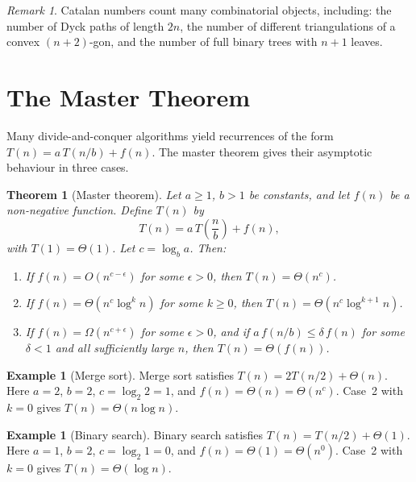 \documentclass[12pt,a4paper,openany]{book}
\theoremstyle{definition}
\newtheorem{example}[definition]{Example}
\theoremstyle{plain}
\newtheorem{theorem}[definition]{Theorem}
\theoremstyle{remark}
\newtheorem{remark}[definition]{Remark}
\begin{document}
\begin{remark}\label{rem:catalan-interpretations}
Catalan numbers count many combinatorial objects, including: the number
of Dyck paths of length $2n$, the number of different
triangulations of a convex $(n+2)$-gon, and the number of full binary
trees with $n+1$ leaves.
\end{remark}

\section{The Master Theorem}\label{sec:master}

Many divide-and-conquer algorithms yield recurrences of the form
$T(n) = a\, T(n/b) + f(n)$.  The master theorem gives their asymptotic
behaviour in three cases.

\begin{theorem}[Master theorem]\label{thm:master}
Let $a \ge 1$, $b > 1$ be constants, and let $f(n)$ be a non-negative
function.  Define $T(n)$ by
\[
   T(n) = a\, T\!\left(\frac{n}{b}\right) + f(n),
\]
with $T(1) = \Theta(1)$.  Let $c = \log_b a$.  Then:
\begin{enumerate}
\item If $f(n) = O(n^{c-\epsilon})$ for some $\epsilon > 0$, then
      $T(n) = \Theta(n^c)$.
\item If $f(n) = \Theta(n^c \log^k n)$ for some $k \ge 0$, then
      $T(n) = \Theta(n^c \log^{k+1} n)$.
\item If $f(n) = \Omega(n^{c+\epsilon})$ for some $\epsilon > 0$,
      and if $a\, f(n/b) \le \delta\, f(n)$ for some $\delta < 1$ and
      all sufficiently large $n$, then $T(n) = \Theta(f(n))$.
\end{enumerate}
\end{theorem}

\begin{example}[Merge sort]\label{ex:merge-sort}
Merge sort satisfies $T(n) = 2T(n/2) + \Theta(n)$.
Here $a = 2$, $b = 2$, $c = \log_2 2 = 1$, and $f(n) = \Theta(n) =
\Theta(n^c)$.  Case~2 with $k = 0$ gives $T(n) = \Theta(n \log n)$.
\end{example}

\begin{example}[Binary search]\label{ex:binary-search}
Binary search satisfies $T(n) = T(n/2) + \Theta(1)$.
Here $a = 1$, $b = 2$, $c = \log_2 1 = 0$, and
$f(n) = \Theta(1) = \Theta(n^0)$.  Case~2 with $k = 0$ gives
$T(n) = \Theta(\log n)$.
\end{example}
\end{document}
